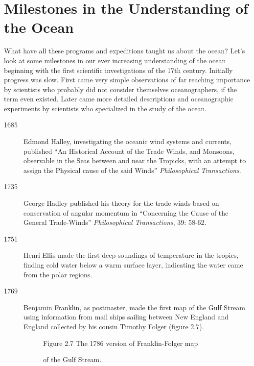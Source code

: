 \vspace{-1ex}
\section{Milestones in the Understanding of the Ocean}
What have all these programs and expeditions taught us about the ocean?
Let's look at some milestones in our ever increasing understanding of the ocean
beginning with the first scientific investigations of the 17th century.
Initially progress was slow. First came very simple observations of far reaching
importance by scientists who probably did not consider themselves
oceanographers, if the term even existed. Later came more detailed descriptions
and oceanographic experiments by scientists who specialized in the study of the
ocean.
\vspace{-1.0ex}
\begin{description}
\item[1685] Edmond Halley, investigating the oceanic wind systems and currents,
published ``An Historical Account of the Trade Winds, and
Monsoons, observable in the Seas between and near the Tropicks,
with an attempt to assign the Physical cause of the said Winds''
\textit{Philosophical Transactions}. \vspace{-1.0ex}

\item[1735] George Hadley published his theory for the trade winds
based on conservation of angular momentum in ``Concerning the
Cause of the General Trade-Winds'' \textit{Philosophical
Transactions}, 39: 58-62. \vspace{-1.0ex} 

\item[1751] Henri Ellis
made the first deep soundings of temperature in the tropics,
finding cold water below a warm surface layer, indicating the
water came from the polar regions. \vspace{-1.0ex} 

\item[1769]
Benjamin Franklin, as postmaster, made the first map of the Gulf
Stream using information from mail ships sailing between New England
and England collected by his cousin Timothy Folger (figure 2.7).

\begin{figure}[t!]
\centering
\footnotesize
Figure 2.7 The 1786 version of Franklin-Folger map \rule{0mm}{3ex}of the Gulf
Stream.
\label{fig:Fig2-7}
\vspace{-2ex}
\end{figure}


\end{description}
